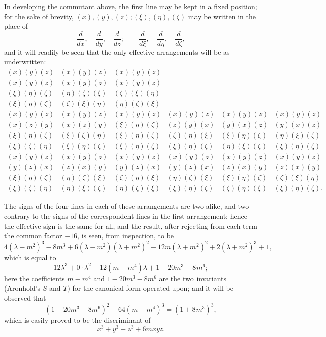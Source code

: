 \documentclass[11pt]{article}
\newcommand{\sourcepage}[1]{\marginpar{\scriptsize p.~#1}}
\begin{document}
In developing the commutant above, the first line may be kept in a fixed position; for the sake of brevity, $(x),(y),(z);(\xi),(\eta),(\zeta)$ may be written in the place of
\[
\frac{d}{dx},\quad\frac{d}{dy},\quad\frac{d}{dz};\qquad
\frac{d}{d\xi},\quad\frac{d}{d\eta},\quad\frac{d}{d\zeta},
\]
and it will readily be seen that the only effective arrangements will be as underwritten:
{\scriptsize
\[
\begin{array}{cccccc}
(x)(y)(z)&(x)(y)(z)&(x)(y)(z)&&&\\
(x)(y)(z)&(x)(y)(z)&(x)(y)(z)&&&\\
(\xi)(\eta)(\zeta)&(\eta)(\zeta)(\xi)&(\zeta)(\xi)(\eta)&&&\\
(\xi)(\eta)(\zeta)&(\zeta)(\xi)(\eta)&(\eta)(\zeta)(\xi)&&&\\[0.35em]
(x)(y)(z)&(x)(y)(z)&(x)(y)(z)&(x)(y)(z)&(x)(y)(z)&(x)(y)(z)\\
(x)(z)(y)&(x)(z)(y)&(\xi)(\eta)(\zeta)&(z)(y)(x)&(y)(x)(z)&(y)(x)(z)\\
(\xi)(\eta)(\zeta)&(\xi)(\zeta)(\eta)&(\xi)(\eta)(\zeta)&(\zeta)(\eta)(\xi)&(\xi)(\eta)(\zeta)&(\eta)(\xi)(\zeta)\\
(\xi)(\zeta)(\eta)&(\xi)(\eta)(\zeta)&(\xi)(\eta)(\zeta)&(\xi)(\eta)(\zeta)&(\eta)(\xi)(\zeta)&(\xi)(\eta)(\zeta)\\[0.35em]
(x)(y)(z)&(x)(y)(z)&(x)(y)(z)&(x)(y)(z)&(x)(y)(z)&(x)(y)(z)\\
(y)(z)(x)&(z)(x)(y)&(y)(z)(x)&(y)(z)(x)&(z)(x)(y)&(z)(x)(y)\\
(\xi)(\eta)(\zeta)&(\eta)(\zeta)(\xi)&(\zeta)(\eta)(\xi)&(\eta)(\zeta)(\xi)&(\xi)(\eta)(\zeta)&(\zeta)(\xi)(\eta)\\
(\xi)(\zeta)(\eta)&(\eta)(\xi)(\zeta)&(\eta)(\zeta)(\xi)&(\xi)(\eta)(\zeta)&(\zeta)(\eta)(\xi)&(\xi)(\eta)(\zeta).
\end{array}
\]
}

\sourcepage{311}
The signs of the four lines in each of these arrangements are two alike, and two contrary to the signs of the correspondent lines in the first arrangement; hence the effective sign is the same for all, and the result, after rejecting from each term the common factor $-16$, is seen, from inspection, to be
\[
4(\lambda-m^2)^3-8m^3+6(\lambda-m^2)(\lambda+m^2)^2-12m(\lambda+m^2)^2
+2(\lambda+m^2)^3+1,
\]
which is equal to
\[
12\lambda^3+0\cdot\lambda^2-12(m-m^4)\lambda+1-20m^3-8m^6;
\]
here the coefficients $m-m^4$ and $1-20m^3-8m^6$ are the two invariants (Aronhold's $S$ and $T$) for the canonical form operated upon; and it will be observed that
\[
(1-20m^3-8m^6)^2+64(m-m^4)^3=(1+8m^3)^3,
\]
which is easily proved to be the discriminant of
\[
x^3+y^3+z^3+6mxyz.
\]
\end{document}
